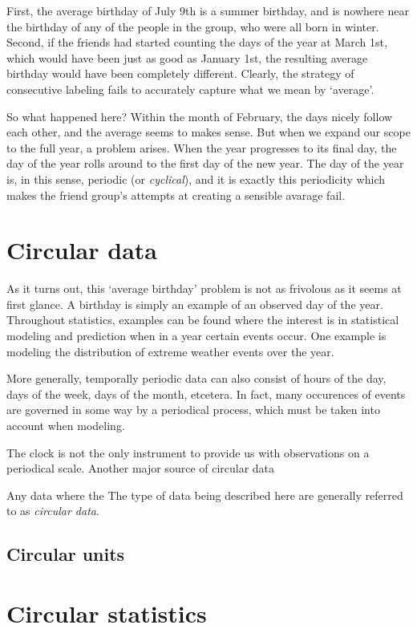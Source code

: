 \documentclass[12pt, a4paper]{book}\usepackage[]{graphicx}\usepackage[]{color}
\begin{document}
First, the average birthday of July 9th is a summer birthday, and is nowhere near the birthday of any of the people in the group, who were all born in winter. Second, if the friends had started counting the days of the year at March 1st, which would have been just as good as January 1st, the resulting average birthday would have been completely different. Clearly, the strategy of consecutive labeling fails to accurately capture what we mean by `average'.

So what happened here? Within the month of February, the days nicely follow each other, and the average seems to makes sense. But when we expand our scope to the full year, a problem arises. When the year progresses to its final day, the day of the year rolls around to the first day of the new year. The day of the year is, in this sense, periodic (or \textit{cyclical}), and it is exactly this periodicity which makes the friend group's attempts at creating a sensible avarage fail.

\section{Circular data}

As it turns out, this `average birthday' problem is not as frivolous as it seems at first glance. A birthday is simply an example of an observed day of the year. Throughout statistics, examples can be found where the interest is in statistical modeling and prediction when in a year certain events occur. One example is modeling the distribution of extreme weather events over the year.

More generally, temporally periodic data can also consist of hours of the day, days of the week, days of the month, etcetera. In fact, many occurences of events are governed in some way by a periodical process, which must be taken into account when modeling.

The clock is not the only instrument to provide us with observations on a periodical scale. Another major source of circular data

Any data where the The type of data being described here are generally referred to as \textit{circular data}.

\subsection{Circular units}


\section{Circular statistics}
\end{document}
